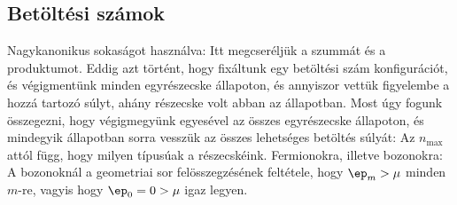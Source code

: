   \subsection{Betöltési számok}
  
   Nagykanonikus sokaságot használva:
   Itt megcseréljük a szummát és a produktumot.
   Eddig azt történt, hogy fixáltunk egy betöltési szám konfigurációt, és végigmentünk minden egyrészecske állapoton, és annyiszor vettük figyelembe a hozzá tartozó súlyt, ahány részecske volt abban az állapotban.
   Most úgy fogunk összegezni, hogy végigmegyünk egyesével az összes egyrészecske állapoton, és mindegyik állapotban sorra vesszük az összes lehetséges betöltés súlyát:
   Az $n_\text{max}$ attól függ, hogy milyen típusúak a részecskéink.
   Fermionokra, illetve bozonokra:
   A bozonoknál a geometriai sor felösszegzésének feltétele, hogy $\ep_m>\mu$ minden $m$-re, vagyis hogy $\ep_0=0>\mu$ igaz legyen.
   
